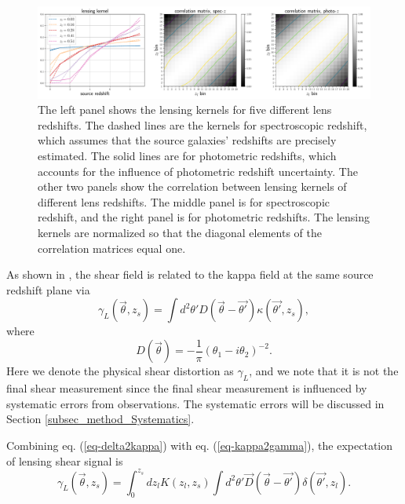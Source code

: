\begin{figure}[!t]
 \centering
 \includegraphics[width=1.\textwidth]{lensing_kernel.pdf}
 \caption{The left panel shows the lensing kernels for five different lens
         redshifts. The dashed lines are the kernels for spectroscopic redshift,
         which assumes that the source galaxies' redshifts are precisely
         estimated. The solid lines are for photometric redshifts, which
         accounts for the influence of photometric redshift uncertainty. The
         other two panels show the correlation between lensing kernels of
         different lens redshifts. The middle panel is for spectroscopic
         redshift, and the right panel is for photometric redshifts. The
         lensing kernels are normalized so that the diagonal elements of the
         correlation matrices equal one.
        }\label{fig_corlensKer}
\end{figure}

As shown in \citet{massMap-KS1993}, the shear field is related to the kappa
field at the same source redshift plane via
\begin{equation}\label{eq-kappa2gamma}
\gamma_L(\vec{\theta},z_s) = \int  d^2 \theta' D(\vec{\theta}-\vec{\theta'}) \kappa(\vec{\theta'},z_s),
\end{equation}
where
\begin{equation}
D(\vec{\theta})=-\frac{1}{\pi}(\theta_1-i\theta_2)^{-2}.
\end{equation}
Here we denote the physical shear distortion as $\gamma_L$, and we note
that it is not the final shear measurement since the final shear
measurement is influenced by systematic errors from observations. The
systematic errors will be discussed in Section \ref{subsec_method_Systematics}.

Combining eq. (\ref{eq-delta2kappa}) with eq. (\ref{eq-kappa2gamma}),
the expectation of lensing shear signal is
\begin{equation}\label{eq-delta2gammat}
\gamma_L(\vec{\theta},z_s) = \int_0^{z_s} dz_l K(z_l,z_s) \int d^2 \theta' \vec{D}(\vec{\theta}-\vec{\theta'}) \delta(\vec{\theta'},z_l).
\end{equation}


